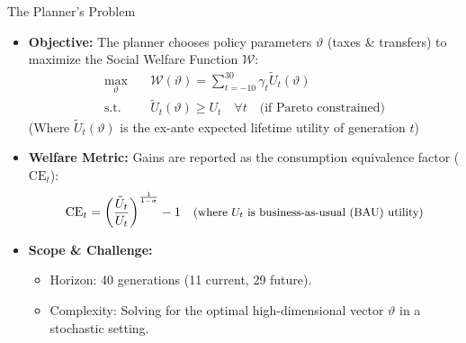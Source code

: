 \documentclass[10pt,aspectratio=169]{beamer}
\begin{document}
\begin{frame}[fragile]{The Planner's Problem}
\small
\begin{itemize}
    \setlength\itemsep{0.8em}
    \item \textbf{Objective:} The planner chooses policy parameters $\vartheta$ (taxes \& transfers) to maximize the Social Welfare Function $\mathcal{W}$:
    \begin{align}
       \max_{\vartheta} \quad & \mathcal{W}(\vartheta) = \sum_{t = -10}^{30} \gamma_t \tilde{U}_t(\vartheta) \\
       \text{s.t.} \quad & \tilde{U}_t(\vartheta) \ge U_t \quad \forall t \quad \text{(if Pareto constrained)} \nonumber
    \end{align}
    \vspace{-0.5em}
    {\footnotesize (Where $\tilde{U}_t(\vartheta)$ is the ex-ante expected lifetime utility of generation $t$)}
    \item \textbf{Welfare Metric:} Gains are reported as the consumption equivalence factor ($\text{CE}_t$):
    \[
       \text{CE}_t = \left(\frac{\tilde{U}_t}{U_t}\right)^{\frac{1}{1-\sigma}}-1 \quad \text{\small{(where $U_t$ is business-as-usual (BAU) utility)}}
    \]
    \item \textbf{Scope \& Challenge:}
    \begin{itemize}
        \item Horizon: 40 generations (11 current, 29 future).
        \item Complexity: Solving for the optimal high-dimensional vector $\vartheta$ in a stochastic setting.
    \end{itemize}
\end{itemize}
\end{frame}
\end{document}
